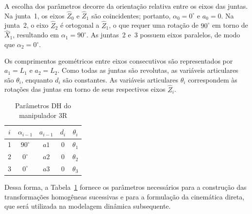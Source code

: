 A escolha dos parâmetros decorre da orientação relativa entre os eixos das juntas.
Na junta~1, os eixos $\hat{Z}_0$ e $\hat{Z}_1$ são coincidentes; portanto, $\alpha_0 = 0^\circ$ e $a_0 = 0$.
Na junta~2, o eixo $\hat{Z}_2$ é ortogonal a $\hat{Z}_1$, o que requer uma rotação de $90^\circ$ em torno de $\hat{X}_1$, resultando em $\alpha_1 = 90^\circ$.
As juntas~2 e~3 possuem eixos paralelos, de modo que $\alpha_2 = 0^\circ$.

Os comprimentos geométricos entre eixos consecutivos são representados por $a_1=L_1$ e $a_2=L_2$.
Como todas as juntas são revolutas, as variáveis articulares são $\theta_i$, enquanto $d_i$ são constantes.
As variáveis articulares $\theta_i$ correspondem às rotações das juntas em torno de seus respectivos eixos $\hat{Z}_{i}$.


\begin{table}[H]
\centering
\caption{Parâmetros DH do manipulador 3R}
\label{tab_dh_zxx}
\begin{tabular}{c|c|c|c|c}
$i$ & $\alpha_{i-1}$ & $a_{i-1}$ & $d_i$ & $\theta_i$ \\
\hline
1 & $90^\circ$ & $a1$    & 0 & $\theta_1$ \\
2 & $0^\circ$  & $a2$ & 0 & $\theta_2$ \\
3 & $0^\circ$  & $a3$ & 0 & $\theta_3$ \\
\end{tabular}
\end{table}

Dessa forma, a Tabela~\ref{tab_dh_zxx} fornece os parâmetros necessários para a construção das transformações homogêneas sucessivas e para a formulação da cinemática direta, que será utilizada na modelagem dinâmica subsequente.


